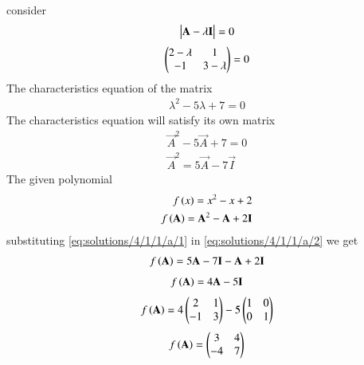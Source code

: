 consider
\begin{align}
    \begin{vmatrix}\mathbf{A}-\lambda\mathbf{I}\end{vmatrix}=0
\end{align}
\begin{align}
    \begin{pmatrix}2-\lambda&1\\-1&3-\lambda\end{pmatrix}=0
\end{align}
 The characteristics equation of the matrix
 \begin{align}
     \lambda^{2}-5\lambda + 7 = 0
 \end{align}
 The characteristics equation will satisfy its own matrix 
 \begin{align}
     \vec{A}^{2}-5\vec{A}+7=0\\
     \vec{A}^{2}=5\vec{A}-7\vec{I}\label{eq:solutions/4/1/1/a/1}
 \end{align}
The given polynomial 
 \begin{align}
     f\left(x\right)=x^{2}-x+2\\
     f\left(\mathbf{A}\right)=\mathbf{A}^{2}-\mathbf{A}+2\mathbf{I}\label{eq:solutions/4/1/1/a/2}
 \end{align}
 substituting \eqref{eq:solutions/4/1/1/a/1} in \eqref{eq:solutions/4/1/1/a/2} we get
 \begin{align}
     f\left(\mathbf{A}\right)=5\mathbf{A}-7\mathbf{I}-\mathbf{A}+2\mathbf{I}
 \end{align}
 \begin{align}
     f\left(\mathbf{A}\right)=4\mathbf{A}-5\mathbf{I}
 \end{align}
 \begin{align}
     f\left(\mathbf{A}\right)=4\begin{pmatrix}2&1\\-1&3\end{pmatrix}-5\begin{pmatrix}1&0\\0&1\end{pmatrix}
 \end{align}
 \begin{align}
     f\left(\mathbf{A}\right)=\begin{pmatrix}3&4\\-4&7\end{pmatrix}
 \end{align}



